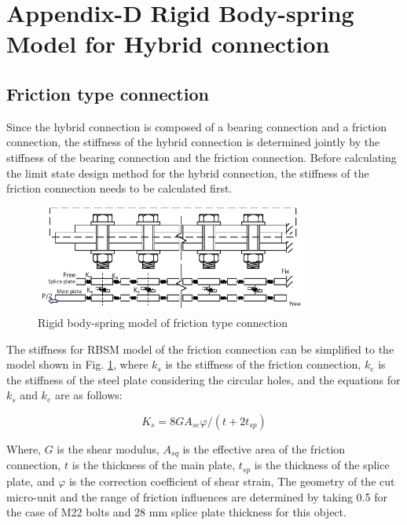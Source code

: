 \section{Appendix-D Rigid Body-spring Model for Hybrid connection}

\subsection{Friction type connection}

Since the hybrid connection is composed of a bearing connection and a friction connection, the stiffness of the hybrid connection is determined jointly by the stiffness of the bearing connection and the friction connection. Before calculating the limit state design method for the hybrid connection, the stiffness of the friction connection needs to be calculated first.

\begin{figure}[htbp]
    \centering
    \includegraphics[width=0.8\textwidth]{imgs/ch7/RBSM.pdf}
    \caption{Rigid body-spring model of friction type connection}
    \label{fig-rbsm}
\end{figure}

The stiffness for \ac{RBSM} model of the friction connection can be simplified to the model shown in Fig. \ref{fig-rbsm}, where $k_{s}$ is the stiffness of the friction connection, $k_{e}$ is the stiffness of the steel plate considering the circular holes, and the equations for $k_{s}$ and $k_{e}$ are as follows:

\begin{equation}\label{eq-ks}
    K_{s} = 8GA_{se} \varphi / (t + 2 t_{sp})
\end{equation}

Where, $G$ is the shear modulus, $A_{sq}$ is the effective area of the friction connection, $t$ is the thickness of the main plate, $t_{sp}$ is the thickness of the splice plate, and $\varphi$ is the correction coefficient of shear strain, The geometry of the cut micro-unit and the range of friction influences are determined by taking 0.5 for the case of M22 bolts and 28 mm splice plate thickness for this object.


